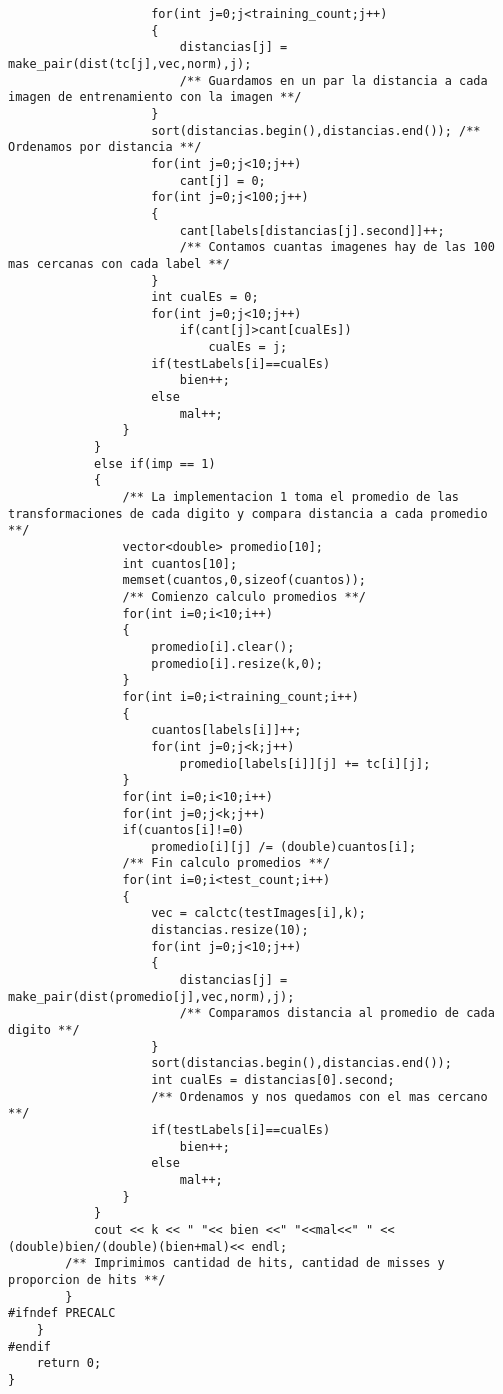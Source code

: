 \begin{lstlisting}
                    for(int j=0;j<training_count;j++)
                    {
                        distancias[j] = make_pair(dist(tc[j],vec,norm),j);
                        /** Guardamos en un par la distancia a cada imagen de entrenamiento con la imagen **/
                    }
                    sort(distancias.begin(),distancias.end()); /** Ordenamos por distancia **/
                    for(int j=0;j<10;j++)
                        cant[j] = 0;            
                    for(int j=0;j<100;j++)
                    {
                        cant[labels[distancias[j].second]]++;
                        /** Contamos cuantas imagenes hay de las 100 mas cercanas con cada label **/
                    }
                    int cualEs = 0;
                    for(int j=0;j<10;j++)
                        if(cant[j]>cant[cualEs])
                            cualEs = j;
                    if(testLabels[i]==cualEs)
                        bien++;
                    else
                        mal++;
                }
            }
            else if(imp == 1)
            {
                /** La implementacion 1 toma el promedio de las transformaciones de cada digito y compara distancia a cada promedio **/
                vector<double> promedio[10];
                int cuantos[10];
                memset(cuantos,0,sizeof(cuantos));
                /** Comienzo calculo promedios **/
                for(int i=0;i<10;i++)
                {
                    promedio[i].clear();
                    promedio[i].resize(k,0);
                }
                for(int i=0;i<training_count;i++)
                {
                    cuantos[labels[i]]++;
                    for(int j=0;j<k;j++)
                        promedio[labels[i]][j] += tc[i][j];
                }
                for(int i=0;i<10;i++)
                for(int j=0;j<k;j++)
                if(cuantos[i]!=0)
                    promedio[i][j] /= (double)cuantos[i];
                /** Fin calculo promedios **/
                for(int i=0;i<test_count;i++)
                {
                    vec = calctc(testImages[i],k);
                    distancias.resize(10);
                    for(int j=0;j<10;j++)
                    {
                        distancias[j] = make_pair(dist(promedio[j],vec,norm),j);
                        /** Comparamos distancia al promedio de cada digito **/
                    }
                    sort(distancias.begin(),distancias.end());
                    int cualEs = distancias[0].second;
                    /** Ordenamos y nos quedamos con el mas cercano **/
                    if(testLabels[i]==cualEs)
                        bien++;
                    else
                        mal++;
                }
            }
            cout << k << " "<< bien <<" "<<mal<<" " << (double)bien/(double)(bien+mal)<< endl;
        /** Imprimimos cantidad de hits, cantidad de misses y proporcion de hits **/
        }
#ifndef PRECALC
    }
#endif
    return 0;
}

\end{lstlisting}
